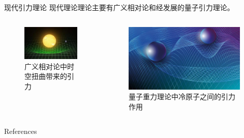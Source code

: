 \documentclass[10pt,aspectratio=43,mathserif]{beamer}
\begin{document}
\begin{frame}{现代引力理论}
    现代理论理论主要有广义相对论和经发展的量子引力理论。
    \begin{columns}
        \begin{column}{.4\linewidth}
            \centering
            \begin{figure}[htbp]
                \includegraphics[width=0.8\linewidth]{fig/123.jpg}
                \caption{广义相对论中时空扭曲带来的引力}
                \label{fig:ETgravity1}    
            \end{figure}
        \end{column}
        \begin{column}{.4\linewidth}
            \centering
            \begin{figure}[htbp]
                \includegraphics[width=0.8\linewidth]{fig/gravity-and-particles-1754139353-Shutterstock_Evgenia-Fux.jpg}
                \caption{量子重力理论中冷原子之间的引力作用}
                \label{fig:QGtwoAtoms}
            \end{figure}
        \end{column}
    \end{columns}
\end{frame}

\begin{frame}[allowframebreaks]{References}
	
	
\end{frame}
\end{document}
